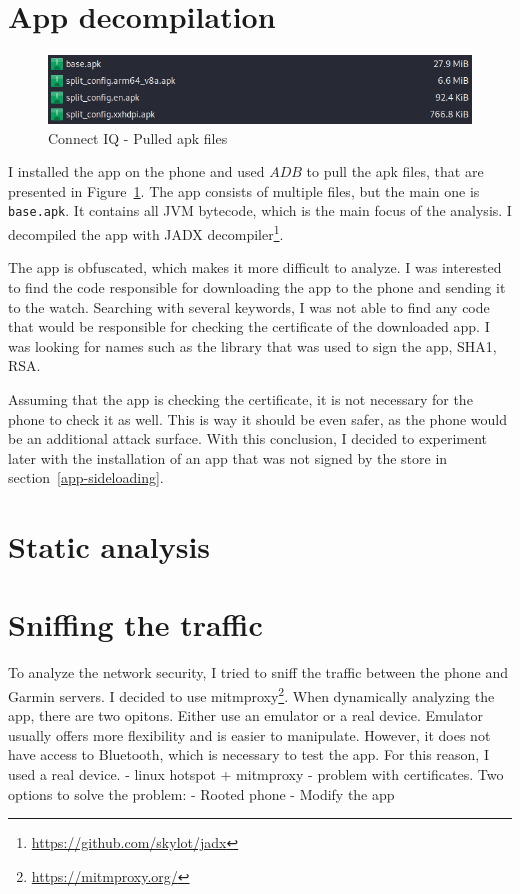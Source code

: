 \section{App decompilation}
\begin{figure}[h]
    \centering
    \includegraphics[width=0.7\linewidth]{../../images/connect-iq-apks}
    \caption{Connect IQ - Pulled apk files}
    \label{fig:connect-iq-apks}
\end{figure}
I installed the app on the phone and used $ADB$ to pull the apk files, that are presented in Figure~\ref{fig:connect-iq-apks}.
The app consists of multiple files, but the main one is \texttt{base.apk}.
It contains all JVM bytecode, which is the main focus of the analysis.
I decompiled the app with JADX decompiler\footnote{\url{https://github.com/skylot/jadx}}.

The app is obfuscated, which makes it more difficult to analyze.
I was interested to find the code responsible for downloading the app to the phone and sending it to the watch.
Searching with several keywords, I was not able to find any code that would be responsible for checking the certificate of the downloaded app.
I was looking for names such as the library that was used to sign the app, SHA1, RSA\@.

Assuming that the app is checking the certificate, it is not necessary for the phone to check it as well.
This is way it should be even safer, as the phone would be an additional attack surface.
With this conclusion, I decided to experiment later with the installation of an app that was not signed by the store in section~\ref{app-sideloading}.
\section{Static analysis}

\section{Sniffing the traffic}
To analyze the network security, I tried to sniff the traffic between the phone and Garmin servers.
I decided to use mitmproxy\footnote{\url{https://mitmproxy.org/}}.
When dynamically analyzing the app, there are two opitons.
Either use an emulator or a real device.
Emulator usually offers more flexibility and is easier to manipulate.
However, it does not have access to Bluetooth, which is necessary to test the app.
For this reason, I used a real device.
- linux hotspot + mitmproxy - problem with certificates.
Two options to solve the problem:
- Rooted phone
- Modify the app

